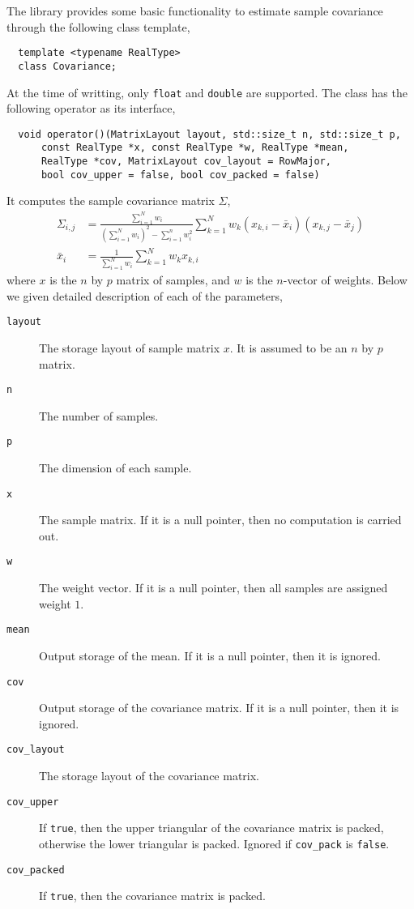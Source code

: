 The library provides some basic functionality to estimate sample covariance
through the following class template,
\begin{Verbatim}
  template <typename RealType>
  class Covariance;
\end{Verbatim}
At the time of writting, only \verb|float| and \verb|double| are supported.
The class has the following operator as its interface,
\begin{Verbatim}
  void operator()(MatrixLayout layout, std::size_t n, std::size_t p,
      const RealType *x, const RealType *w, RealType *mean,
      RealType *cov, MatrixLayout cov_layout = RowMajor,
      bool cov_upper = false, bool cov_packed = false)
\end{Verbatim}
It computes the sample covariance matrix $\Sigma$,
\begin{align*}
  \Sigma_{i,j} &= \frac{\sum_{i=1}^N w_i}
  {(\sum_{i=1}^N w_i)^2 - \sum_{i=1}^n w_i^2}
  \sum_{k=1}^N w_k (x_{k,i} - \bar{x}_i)(x_{k,j} - \bar{x}_j) \\
  \bar{x}_i &= \frac{1}{\sum_{i=1}^N w_i}\sum_{k=1}^N w_k x_{k,i}
\end{align*}
where $x$ is the $n$ by $p$ matrix of samples, and $w$ is the $n$-vector of
weights. Below we given detailed description of each of the parameters,
\begin{description}
  \item[\texttt{layout}] The storage layout of sample matrix $x$. It is assumed
    to be an $n$ by $p$ matrix.
  \item[\texttt{n}] The number of samples.
  \item[\texttt{p}] The dimension of each sample.
  \item[\texttt{x}] The sample matrix. If it is a null pointer, then no
    computation is carried out.
  \item[\texttt{w}] The weight vector. If it is a null pointer, then all
    samples are assigned weight $1$.
  \item[\texttt{mean}] Output storage of the mean. If it is a null pointer,
    then it is ignored.
  \item[\texttt{cov}] Output storage of the covariance matrix. If it is a null
    pointer, then it is ignored.
  \item[\texttt{cov\_layout}] The storage layout of the covariance matrix.
  \item[\texttt{cov\_upper}] If \verb|true|, then the upper triangular of the
    covariance matrix is packed, otherwise the lower triangular is packed.
    Ignored if \verb|cov_pack| is \verb|false|.
  \item[\texttt{cov\_packed}] If \verb|true|, then the covariance matrix is
    packed.
\end{description}
